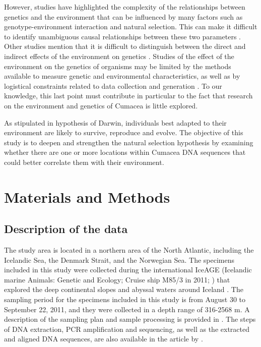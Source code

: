 However, studies have highlighted the complexity of the relationships between genetics and the environment that can be influenced by many factors such as genotype-environment interaction and natural selection. This can make it difficult to identify unambiguous causal relationships between these two parameters \citep{manel_perspectives_2010}. Other studies mention that it is difficult to distinguish between the direct and indirect effects of the environment on genetics \citep{manel_perspectives_2010, balkenhol_landscape_2019}. Studies of the effect of the environment on the genetics of organisms may be limited by the methods available to measure genetic and environmental characteristics, as well as by logistical constraints related to data collection and generation \citep{manel_perspectives_2010, shafer_widespread_2013}. To our knowledge, this last point must contribute in particular to the fact that research on the environment and genetics of Cumacea is little explored.

As stipulated in hypothesis of Darwin, individuals best adapted to their environment are likely to survive, reproduce and evolve. The objective of this study is to deepen and strengthen the natural selection hypothesis by examining whether there are one or more locations within Cumacea DNA sequences that could better correlate them with their environment.

\section{Materials and Methods}\label{materials-methods}

\subsection{Description of the data}
The study area is located in a northern area of the North Atlantic, including the Icelandic Sea, the Denmark Strait, and the Norwegian Sea. The specimens included in this study were collected during the international IceAGE (Icelandic marine Animals: Genetic and Ecology; Cruise ship M85/3 in 2011; \citep{meisner_prefacebiodiversity_2018}) that explored the deep continental slopes and abyssal waters around Iceland \citep{meisner_prefacebiodiversity_2018}. The sampling period for the specimens included in this study is from August 30 to September 22, 2011, and they were collected in a depth range of 316-2568 m. A description of the sampling plan and sample processing is provided in \citep{uhlir_adding_2021}. The steps of DNA extraction, PCR amplification and sequencing, as well as the extracted and aligned DNA sequences, are also available in the article by \citep{uhlir_adding_2021}.

